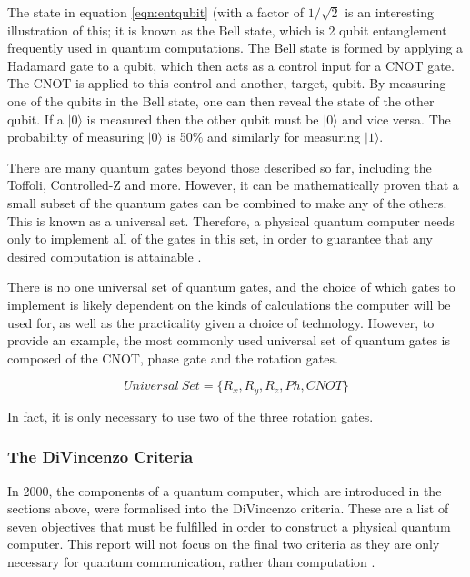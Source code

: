 The state in equation \ref{eqn:entqubit} (with a factor of $1/\sqrt{2}$ is an interesting illustration of this; it is known as the Bell state, which is 2 qubit entanglement frequently used in quantum computations. The Bell state is formed by applying a Hadamard gate to a qubit, which then acts as a control input for a CNOT gate. The CNOT is applied to this control and another, target, qubit. \cite{mermin_quantum_2007} 
By measuring one of the qubits in the Bell state, one can then reveal the state of the other qubit. If a $|0\rangle$ is measured then the other qubit must be $|0\rangle$ and vice versa. The probability of measuring $|0\rangle$ is 50$\%$ and similarly for measuring $|1\rangle$. 

There are many quantum gates beyond those described so far, including the Toffoli, Controlled-Z and more. However, it can be mathematically proven that a small subset of the quantum gates can be combined to make any of the others. This is known as a universal set. Therefore, a physical quantum computer needs only to implement all of the gates in this set, in order to guarantee that any desired computation is attainable \cite{universalset}.

There is no one universal set of quantum gates, and the choice of which gates to implement is likely dependent on the kinds of calculations the computer will be used for, as well as the practicality given a choice of technology. However, to provide an example, the most commonly used universal set of quantum gates is composed of the CNOT, phase gate and the rotation gates.

\begin{equation}
    Universal\ Set = \{ R_x, R_y, R_z, Ph, CNOT \}
\end{equation}

In fact, it is only necessary to use two of the three rotation gates.

\subsubsection{The DiVincenzo Criteria}
In 2000, the components of a quantum computer, which are introduced in the sections above, were formalised into the DiVincenzo criteria. These are a list of seven objectives that must be fulfilled in order to construct a physical quantum computer. This report will not focus on the final two criteria as they are only necessary for quantum communication, rather than computation \cite{bergou_quantum_2021}.

